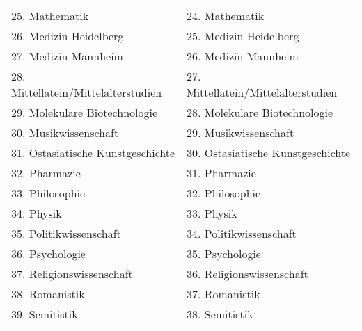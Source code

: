 {\begin{longtable}{|p{7.5cm}|p{7.5cm}|}
        25. Mathematik                                                   & 24. Mathematik                                                   \\
        26. Medizin Heidelberg                                           & 25. Medizin Heidelberg                                           \\
        27. Medizin Mannheim                                             & 26. Medizin Mannheim                                             \\
        28. Mittellatein/Mittelalterstudien                              & 27. Mittellatein/Mittelalterstudien                              \\
        29. Molekulare Biotechnologie                                    & 28. Molekulare Biotechnologie                                    \\
        30. Musikwissenschaft                                            & 29. Musikwissenschaft                                            \\
        31. Ostasiatische Kunstgeschichte                                & 30. Ostasiatische Kunstgeschichte                                \\
        32. Pharmazie                                                    & 31. Pharmazie                                                    \\
        33. Philosophie                                                  & 32. Philosophie                                                  \\
        34. Physik                                                       & 33. Physik                                                       \\
        35. Politikwissenschaft                                          & 34. Politikwissenschaft                                          \\
        36. Psychologie                                                  & 35. Psychologie                                                  \\
        37. Religionswissenschaft                                        & 36. Religionswissenschaft                                        \\
        38. Romanistik                                                   & 37. Romanistik                                                   \\
        39. Semitistik                                                   & 38. Semitistik                                                   \\

\end{longtable}}
